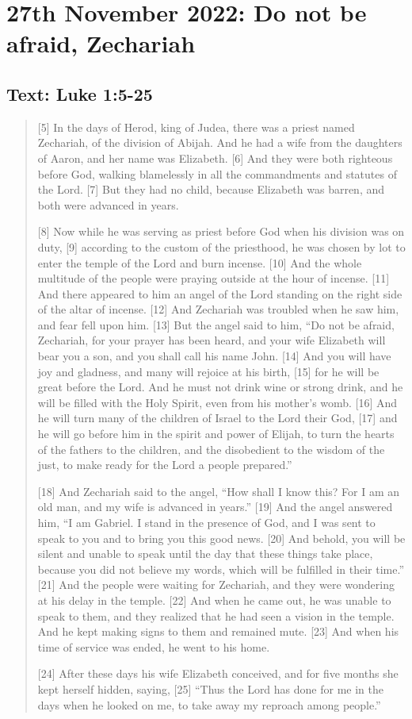 \section{27th November 2022: Do not be afraid, Zechariah}
\subsection*{Text: Luke 1:5-25}
  \begin{quote}
    [5] In the days of Herod, king of Judea, there was a priest named
    Zechariah, of the division of Abijah.  And he had a wife from the
    daughters of Aaron, and her name was Elizabeth.  [6] And they were both
    righteous before God, walking blamelessly in all the commandments and
    statutes of the Lord.  [7] But they had no child, because Elizabeth was
    barren, and both were advanced in years.

    [8] Now while he was serving as priest before God when his division was
    on duty, [9] according to the custom of the priesthood, he was chosen by
    lot to enter the temple of the Lord and burn incense.  [10] And the whole
    multitude of the people were praying outside at the hour of incense.
    [11] And there appeared to him an angel of the Lord standing on the right
    side of the altar of incense.  [12] And Zechariah was troubled when he
    saw him, and fear fell upon him.  [13] But the angel said to him, “Do not
    be afraid, Zechariah, for your prayer has been heard, and your wife
    Elizabeth will bear you a son, and you shall call his name John.  [14]
    And you will have joy and gladness, and many will rejoice at his birth,
    [15] for he will be great before the Lord.  And he must not drink wine or
    strong drink, and he will be filled with the Holy Spirit, even from his
    mother’s womb.  [16] And he will turn many of the children of Israel to
    the Lord their God, [17] and he will go before him in the spirit and
    power of Elijah, to turn the hearts of the fathers to the children, and
    the disobedient to the wisdom of the just, to make ready for the Lord a
    people prepared.”

    [18] And Zechariah said to the angel, “How shall I know this?  For I am
    an old man, and my wife is advanced in years.” [19] And the angel
    answered him, “I am Gabriel.  I stand in the presence of God, and I was
    sent to speak to you and to bring you this good news.  [20] And behold,
    you will be silent and unable to speak until the day that these things
    take place, because you did not believe my words, which will be fulfilled
    in their time.” [21] And the people were waiting for Zechariah, and they
    were wondering at his delay in the temple.  [22] And when he came out, he
    was unable to speak to them, and they realized that he had seen a vision
    in the temple.  And he kept making signs to them and remained mute.  [23]
    And when his time of service was ended, he went to his home.

    [24] After these days his wife Elizabeth conceived, and for five months
    she kept herself hidden, saying, [25] “Thus the Lord has done for me in
    the days when he looked on me, to take away my reproach among people.”
  \end{quote}
